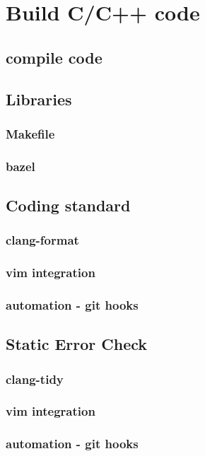 \chapter{Build C/C++ code}

\section{compile code} 


\section{Libraries} 

\subsection{Makefile} 

\subsection{bazel} 

\section{Coding standard} 
\subsection{clang-format}
\subsection{vim integration}
\subsection{automation - git hooks}


\section{Static Error Check} 
\subsection{clang-tidy}
\subsection{vim integration}
\subsection{automation - git hooks}
